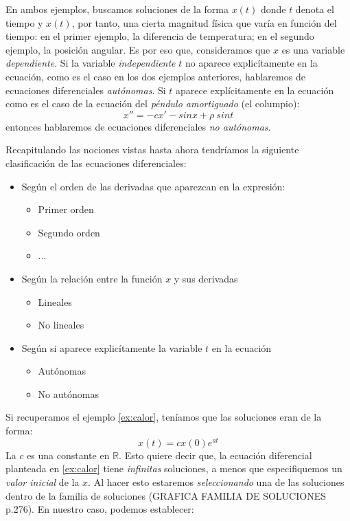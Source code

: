 En ambos ejemplos, buscamos soluciones de la forma $x(t)$ donde $t$ denota el tiempo y $x(t)$, por tanto, una cierta magnitud física que varía en función del tiempo: en el primer ejemplo, la diferencia de temperatura; en el segundo ejemplo, la posición angular. Es por eso que, consideramos que $x$ es una variable \emph{dependiente}. Si la variable \emph{independiente} $t$ no aparece explicítamente en la ecuación, como es el caso en los dos ejemplos anteriores, hablaremos de ecuaciones diferenciales \emph{autónomas}. Si $t$ aparece explícitamente en la ecuación como es el caso de la ecuación del \emph{péndulo amortiguado} (el columpio):
\begin{equation}
x'' = -cx'-sinx+\rho~sint
\end{equation}
entonces hablaremos de ecuaciones diferenciales \emph{no autónomas}.

Recapitulando las nociones vistas hasta ahora tendríamos la siguiente clasificación de las ecuaciones diferenciales:

\begin{itemize}
\item Según el orden de las derivadas que aparezcan en la expresión:
	\begin{itemize}
	\item Primer orden
	\item Segundo orden
	\item ...
	\end{itemize}
\item Según la relación entre la función $x$ y sus derivadas
	\begin{itemize}
	\item Lineales
	\item No lineales
	\end{itemize}
\item Según si aparece explicítamente la variable $t$ en la ecuación
	\begin{itemize}
	\item Autónomas
	\item No autónomas
	\end{itemize}
\end{itemize}

Si recuperamos el ejemplo \ref{ex:calor}, teníamos que las soluciones eran de la forma:
\begin{equation}
x(t) = c x(0)e^{at}
\end{equation}
 La $c$ es una constante en $\mathbb{R}$. Esto quiere decir que, la ecuación diferencial planteada en \ref{ex:calor} tiene \emph{infinitas} soluciones, a menos que especifiquemos un \emph{valor inicial} de la $x$. Al hacer esto estaremos \emph{seleccionando} una de las soluciones dentro de la familia de soluciones (GRAFICA FAMILIA DE SOLUCIONES p.276). En nuestro caso, podemos establecer:

